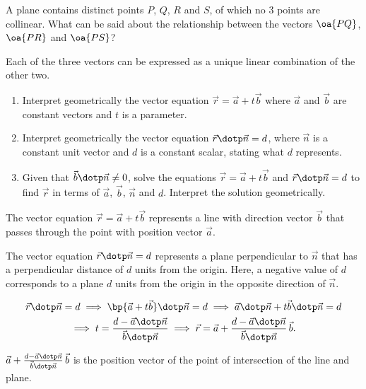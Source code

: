 \begin{problem}
    A plane contains distinct points $P$, $Q$, $R$ and $S$, of which no 3 points are collinear. What can be said about the relationship between the vectors $\oa{PQ}$, $\oa{PR}$ and $\oa{PS}$?
\end{problem}
\begin{solution}
    Each of the three vectors can be expressed as a unique linear combination of the other two.
\end{solution}

\begin{problem}
    \begin{enumerate}
        \item Interpret geometrically the vector equation $\vec r = \vec a + t\vec b$ where $\vec a$ and $\vec b$ are constant vectors and $t$ is a parameter.
        \item Interpret geometrically the vector equation $\vec r \dotp \vec n = d$, where $\vec n$ is a constant unit vector and $d$ is a constant scalar, stating what $d$ represents.
        \item Given that $\vec b \dotp \vec n \neq 0$, solve the equations $\vec r = \vec a + t\vec b$ and $\vec r \dotp \vec n = d$ to find $\vec r$ in terms of $\vec a$, $\vec b$, $\vec n$ and $d$. Interpret the solution geometrically.
    \end{enumerate}
\end{problem}
\begin{solution}
    \begin{ppart}
        The vector equation $\vec r = \vec a + t\vec b$ represents a line with direction vector $\vec b$ that passes through the point with position vector $\vec a$.
    \end{ppart}
    \begin{ppart}
        The vector equation $\vec r \dotp \vec n = d$ represents a plane perpendicular to $\vec n$ that has a perpendicular distance of $d$ units from the origin. Here, a negative value of $d$ corresponds to a plane $d$ units from the origin in the opposite direction of $\vec n$.
    \end{ppart}
    \begin{ppart}
        \begin{gather*}
            \vec r \dotp \vec n = d \implies \bp{\vec a + t\vec b} \dotp \vec n = d \implies \vec a \dotp \vec n + t\vec b \dotp \vec n = d\\
            \implies t = \frac{d - \vec a \dotp \vec n}{\vec b \dotp \vec n} \implies \vec r = \vec a + \frac{d - \vec a \dotp \vec n}{\vec b \dotp \vec n} \, \vec b.
        \end{gather*}

        $\vec a + \frac{d - \vec a \dotp \vec n}{\vec b \dotp \vec n} \, \vec b$ is the position vector of the point of intersection of the line and plane.
    \end{ppart}
\end{solution}

